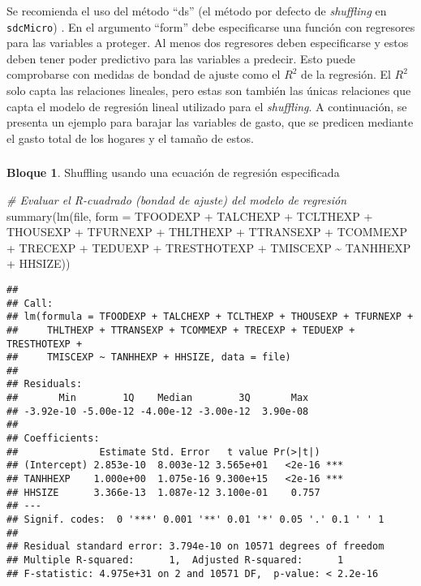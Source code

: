 \documentclass[
]{book}
\newenvironment{Shaded}{\begin{snugshade}}{\end{snugshade}}
\newcommand{\AttributeTok}[1]{\textcolor[rgb]{0.77,0.63,0.00}{#1}}
\newcommand{\CommentTok}[1]{\textcolor[rgb]{0.56,0.35,0.01}{\textit{#1}}}
\newcommand{\FunctionTok}[1]{\textcolor[rgb]{0.00,0.00,0.00}{#1}}
\newcommand{\NormalTok}[1]{#1}
\newcommand{\SpecialCharTok}[1]{\textcolor[rgb]{0.00,0.00,0.00}{#1}}
\theoremstyle{definition}
\theoremstyle{definition}
\newtheorem{example}{Bloque}[chapter]
\theoremstyle{definition}
\theoremstyle{definition}
\theoremstyle{remark}
\begin{document}
Se recomienda el uso del método ``ds'' (el método por defecto de \emph{shuffling} en \texttt{sdcMicro}) \citep{TeMK14}. En el argumento ``form'' debe especificarse una función con regresores para las variables a proteger. Al menos dos regresores deben especificarse y estos deben tener poder predictivo para las variables a predecir. Esto puede comprobarse con medidas de bondad de ajuste como el \(R^2\) de la regresión. El \(R^2\) solo capta las relaciones lineales, pero estas son también las únicas relaciones que capta el modelo de regresión lineal utilizado para el \emph{shuffling}. A continuación, se presenta un ejemplo para barajar las variables de gasto, que se predicen mediante el gasto total de los hogares y el tamaño de estos.

\hypertarget{section-12}{%
\subsubsection{}\label{section-12}}

\begin{example}
\protect\hypertarget{exm:bloque38jgm}{}\label{exm:bloque38jgm}Shuffling usando una ecuación de regresión especificada
\end{example}

\begin{Shaded}
\begin{Highlighting}[]
\CommentTok{\# Evaluar el R{-}cuadrado (bondad de ajuste) del modelo de regresión}
\FunctionTok{summary}\NormalTok{(}\FunctionTok{lm}\NormalTok{(file, }\AttributeTok{form =}\NormalTok{ TFOODEXP }\SpecialCharTok{+}\NormalTok{ TALCHEXP }\SpecialCharTok{+}\NormalTok{ TCLTHEXP }\SpecialCharTok{+}\NormalTok{ THOUSEXP }\SpecialCharTok{+}\NormalTok{ TFURNEXP }\SpecialCharTok{+}\NormalTok{ THLTHEXP }\SpecialCharTok{+}\NormalTok{ TTRANSEXP }\SpecialCharTok{+}\NormalTok{ TCOMMEXP }\SpecialCharTok{+}\NormalTok{ TRECEXP }\SpecialCharTok{+}\NormalTok{ TEDUEXP }\SpecialCharTok{+}\NormalTok{ TRESTHOTEXP }\SpecialCharTok{+}\NormalTok{ TMISCEXP }\SpecialCharTok{\textasciitilde{}}\NormalTok{ TANHHEXP }\SpecialCharTok{+}\NormalTok{ HHSIZE)) }
\end{Highlighting}
\end{Shaded}

\begin{verbatim}
## 
## Call:
## lm(formula = TFOODEXP + TALCHEXP + TCLTHEXP + THOUSEXP + TFURNEXP + 
##     THLTHEXP + TTRANSEXP + TCOMMEXP + TRECEXP + TEDUEXP + TRESTHOTEXP + 
##     TMISCEXP ~ TANHHEXP + HHSIZE, data = file)
## 
## Residuals:
##       Min        1Q    Median        3Q       Max 
## -3.92e-10 -5.00e-12 -4.00e-12 -3.00e-12  3.90e-08 
## 
## Coefficients:
##              Estimate Std. Error   t value Pr(>|t|)    
## (Intercept) 2.853e-10  8.003e-12 3.565e+01   <2e-16 ***
## TANHHEXP    1.000e+00  1.075e-16 9.300e+15   <2e-16 ***
## HHSIZE      3.366e-13  1.087e-12 3.100e-01    0.757    
## ---
## Signif. codes:  0 '***' 0.001 '**' 0.01 '*' 0.05 '.' 0.1 ' ' 1
## 
## Residual standard error: 3.794e-10 on 10571 degrees of freedom
## Multiple R-squared:      1,  Adjusted R-squared:      1 
## F-statistic: 4.975e+31 on 2 and 10571 DF,  p-value: < 2.2e-16
\end{verbatim}
\end{document}
